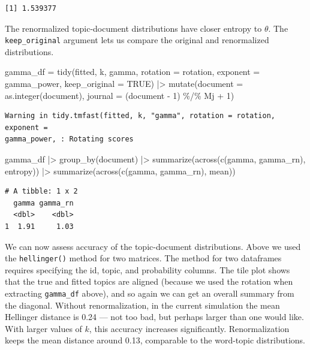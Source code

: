 \documentclass[
]{article}
\newenvironment{Shaded}{\begin{snugshade}}{\end{snugshade}}
\newcommand{\AttributeTok}[1]{\textcolor[rgb]{0.40,0.45,0.13}{#1}}
\newcommand{\ConstantTok}[1]{\textcolor[rgb]{0.56,0.35,0.01}{#1}}
\newcommand{\DecValTok}[1]{\textcolor[rgb]{0.68,0.00,0.00}{#1}}
\newcommand{\FunctionTok}[1]{\textcolor[rgb]{0.28,0.35,0.67}{#1}}
\newcommand{\NormalTok}[1]{\textcolor[rgb]{0.00,0.23,0.31}{#1}}
\newcommand{\OtherTok}[1]{\textcolor[rgb]{0.00,0.23,0.31}{#1}}
\newcommand{\SpecialCharTok}[1]{\textcolor[rgb]{0.37,0.37,0.37}{#1}}
\newcommand{\StringTok}[1]{\textcolor[rgb]{0.13,0.47,0.30}{#1}}
\begin{document}
\begin{verbatim}
[1] 1.539377
\end{verbatim}

The renormalized topic-document distributions have closer entropy to
\(\theta\). The \texttt{keep\_original} argument lets us compare the
original and renormalized distributions.

\begin{Shaded}
\begin{Highlighting}[]
\NormalTok{gamma\_df }\OtherTok{=} \FunctionTok{tidy}\NormalTok{(fitted, k, }\StringTok{\textquotesingle{}gamma\textquotesingle{}}\NormalTok{, }
                \AttributeTok{rotation =}\NormalTok{ rotation, }
                \AttributeTok{exponent =}\NormalTok{ gamma\_power, }
                \AttributeTok{keep\_original =} \ConstantTok{TRUE}\NormalTok{) }\SpecialCharTok{|\textgreater{}} 
    \FunctionTok{mutate}\NormalTok{(}\AttributeTok{document =} \FunctionTok{as.integer}\NormalTok{(document),}
           \AttributeTok{journal =}\NormalTok{ (document }\SpecialCharTok{{-}} \DecValTok{1}\NormalTok{) }\SpecialCharTok{\%/\%}\NormalTok{ Mj }\SpecialCharTok{+} \DecValTok{1}\NormalTok{)}
\end{Highlighting}
\end{Shaded}

\begin{verbatim}
Warning in tidy.tmfast(fitted, k, "gamma", rotation = rotation, exponent =
gamma_power, : Rotating scores
\end{verbatim}

\begin{Shaded}
\begin{Highlighting}[]
\NormalTok{gamma\_df }\SpecialCharTok{|\textgreater{}} 
    \FunctionTok{group\_by}\NormalTok{(document) }\SpecialCharTok{|\textgreater{}} 
    \FunctionTok{summarize}\NormalTok{(}\FunctionTok{across}\NormalTok{(}\FunctionTok{c}\NormalTok{(gamma, gamma\_rn), entropy)) }\SpecialCharTok{|\textgreater{}} 
    \FunctionTok{summarize}\NormalTok{(}\FunctionTok{across}\NormalTok{(}\FunctionTok{c}\NormalTok{(gamma, gamma\_rn), mean))}
\end{Highlighting}
\end{Shaded}

\begin{verbatim}
# A tibble: 1 x 2
  gamma gamma_rn
  <dbl>    <dbl>
1  1.91     1.03
\end{verbatim}

We can now assess accuracy of the topic-document distributions. Above we
used the \texttt{hellinger()} method for two matrices. The method for
two dataframes requires specifying the id, topic, and probability
columns. The tile plot shows that the true and fitted topics are aligned
(because we used the rotation when extracting \texttt{gamma\_df} above),
and so again we can get an overall summary from the diagonal. Without
renormalization, in the current simulation the mean Hellinger distance
is 0.24 --- not too bad, but perhaps larger than one would like. With
larger values of \(k\), this accuracy increases significantly.
Renormalization keeps the mean distance around 0.13, comparable to the
word-topic distributions.
\end{document}
